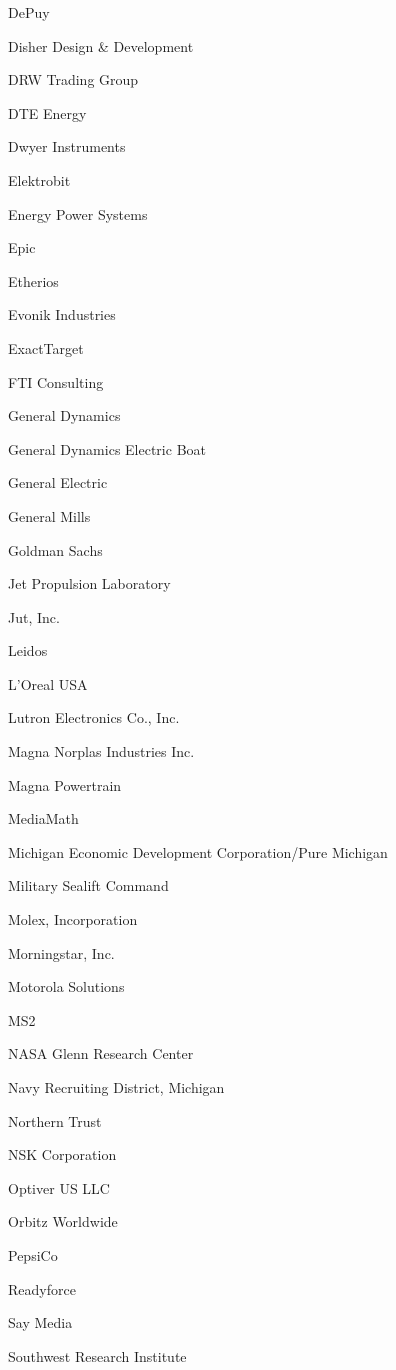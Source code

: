 \documentclass[twoside]{article}
\begin{document}
\begin{center}
\begin{multicols}{5}
\begin{FlushLeft}
\begin{compactitem}
\item DePuy
\item Disher Design \& Development
\item DRW Trading Group
\item DTE Energy
\item Dwyer Instruments
\item Elektrobit
\item Energy Power Systems
\item Epic
\item Etherios
\item Evonik Industries
\item ExactTarget
\item FTI Consulting
\item General Dynamics
\item General Dynamics Electric Boat
\item General Electric
\item General Mills
\item Goldman Sachs
\item Jet Propulsion Laboratory
\item Jut, Inc.
\item Leidos
\item L'Oreal USA
\item Lutron Electronics Co., Inc.
\item Magna Norplas Industries Inc.
\item Magna Powertrain
\item MediaMath
\item Michigan Economic Development Corporation/Pure Michigan
\item Military Sealift Command
\item Molex, Incorporation
\item Morningstar, Inc.
\item Motorola Solutions
\item MS2
\item NASA Glenn Research Center
\item Navy Recruiting District, Michigan
\item Northern Trust
\item NSK Corporation
\item Optiver US LLC
\item Orbitz Worldwide
\item PepsiCo
\item Readyforce
\item Say Media
\item Southwest Research Institute

\end{compactitem}
\end{FlushLeft}
\end{multicols}
\end{center}
\end{document}
